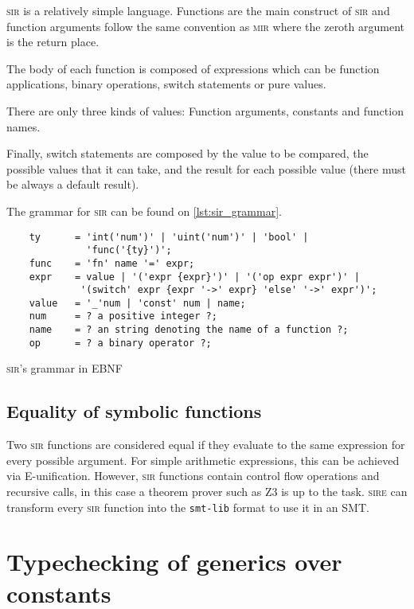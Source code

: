 \textsc{sir} is a relatively simple language. Functions are the main construct
of \textsc{sir} and function arguments follow the same convention as
\textsc{mir} where the zeroth argument is the return place. 

The body of each function is composed of expressions which can be function
applications, binary operations, switch statements or pure values. 

There are only three kinds of values: Function arguments, constants and
function names. 

Finally, switch statements are composed by the value to be compared, the
possible values that it can take, and the result for each possible value (there
must be always a default result). 

The grammar for \textsc{sir} can be found on \ref{lst:sir_grammar}.

\begin{listing}[ht]
    \begin{verbatim}
    ty      = 'int('num')' | 'uint('num')' | 'bool' | 
              'func('{ty}')';
    func    = 'fn' name '=' expr;
    expr    = value | '('expr {expr}')' | '('op expr expr')' | 
             '(switch' expr {expr '->' expr} 'else' '->' expr')';
    value   = '_'num | 'const' num | name;
    num     = ? a positive integer ?;
    name    = ? an string denoting the name of a function ?;
    op      = ? a binary operator ?;
    \end{verbatim}
    \caption{\textsc{sir}'s grammar in EBNF}
  \label{lst:sir_grammar}
\end{listing}


\subsection{Equality of symbolic functions}

Two \textsc{sir} functions are considered equal if they evaluate to the same
expression for every possible argument. For simple arithmetic expressions, this
can be achieved via E-unification. However, \textsc{sir} functions contain
control flow operations and recursive calls, in this case a theorem prover such
as Z3 is up to the task. \textsc{sire} can transform every \textsc{sir}
function into the \texttt{smt-lib} format to use it in an SMT.

\section{Typechecking of generics over constants}

